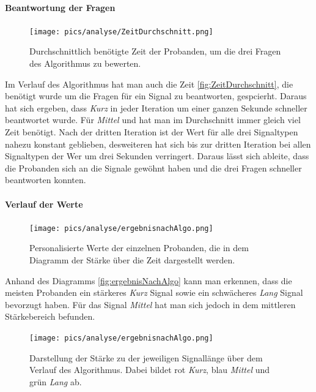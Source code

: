 \paragraph{Beantwortung der Fragen}
\begin{figure}[htbp] 
            \centering
   	\texttt{[image: pics/analyse/ZeitDurchschnitt.png]}
	\caption{Durchschnittlich benötigte Zeit der Probanden, um die drei Fragen des Algorithmus zu bewerten.}
	\label{fig:ZeitDurchschnitt}
\end{figure}
Im Verlauf des Algorithmus hat man auch die Zeit \autoref{fig:ZeitDurchschnitt}, die benötigt wurde um die Fragen für ein Signal zu beantworten, gespcierht. 
Daraus hat sich ergeben, dass \textit{Kurz} in jeder Iteration um einer ganzen Sekunde schneller beantwortet wurde. 
Für \textit{Mittel} und  hat man im Durchschnitt immer gleich viel Zeit benötigt.
Nach der dritten Iteration ist der Wert für alle drei Signaltypen nahezu konstant geblieben, desweiteren hat sich bis zur dritten Iteration bei allen Signaltypen der Wer um drei Sekunden verringert. 
Daraus lässt sich ableite, dass die Probanden sich an die Signale gewöhnt haben und die drei Fragen schneller beantworten konnten.

\paragraph{Verlauf der Werte}
\begin{figure}[htbp] 
            \centering
   	\texttt{[image: pics/analyse/ergebnisnachAlgo.png]}
	\caption{Personalisierte Werte der einzelnen Probanden, die in dem Diagramm der Stärke über die Zeit dargestellt werden.}
	\label{fig:ergebnisNachAlgo}
\end{figure}

Anhand des Diagramms \autoref{fig:ergebnisNachAlgo} kann man erkennen, dass die meisten Probanden ein stärkeres \textit{Kurz} Signal sowie ein schwächeres \textit{Lang} Signal bevorzugt haben. Für das Signal \textit{Mittel} hat man sich jedoch in dem mittleren Stärkebereich befunden.

\begin{figure}[htbp] 
            \centering
   	\texttt{[image: pics/analyse/ergebnisnachAlgo.png]}
	\caption{Darstellung der Stärke zu der jeweiligen Signallänge über dem Verlauf des Algorithmus. Dabei bildet rot \textit{Kurz}, blau \textit{Mittel} und grün \textit{Lang} ab.}
	\label{fig:gruppierung}
\end{figure}

